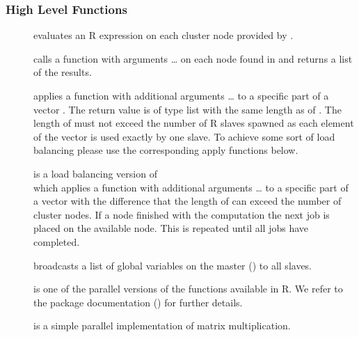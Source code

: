 \subsubsection{High Level Functions}
\begin{description}
\item[] evaluates an R expression
   on
  each cluster node provided by . 
\item[] calls a function
   with arguments \ldots{} on each node found in 
  and returns a list of the results.
\item[] applies a function
   with additional arguments \ldots{} to a specific part of
  a vector . The return value is of type list with the same
  length as of . The length of
   must not exceed the 
  number of R slaves spawned as each element of the vector is used
  exactly by one slave. To achieve some sort of load balancing please
  use the corresponding apply functions below.
\item[] is a load balancing
  version of \\  which applies a function
   with additional arguments \ldots{} to a specific part of
  a vector  with the difference that the length of
   can exceed the number of cluster nodes. If a node
  finished with the computation the next job is placed on the
  available node. This is repeated until all jobs have completed.
\item[] broadcasts a list of global
  variables on the master () to all slaves.
\item[] is one of the parallel
  versions of the  functions available in R. We refer to
  the package documentation (\cite{tierney07snow}) for further details.
\item[] is a simple parallel implementation of
  matrix multiplication. 
\end{description}

